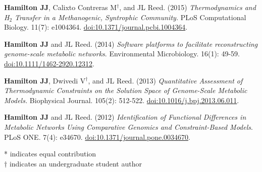 \documentclass[letterpaper,10pt]{article}
\begin{document}
\begin{etaremune}[itemsep=-2pt]
	\item \textbf{Hamilton JJ}, Calixto Contreras M$^\dagger$, and JL Reed. (2015) \emph{Thermodynamics and H$_2$ Transfer in a Methanogenic, Syntrophic Community.} PLoS Computational Biology. 11(7): e1004364. \href{http://journals.plos.org/ploscompbiol/article?id=10.1371/journal.pcbi.1004364}{doi:10.1371/journal.pcbi.1004364}.
	\item \textbf{Hamilton JJ} and JL Reed. (2014) \emph{Software platforms to facilitate reconstructing genome-scale metabolic networks}. Environmental Microbiology. 16(1): 49-59. \href{http://onlinelibrary.wiley.com/doi/10.1111/1462-2920.12312/abstract}{doi:10.1111/1462-2920.12312}.
	\item \textbf{Hamilton JJ}, Dwivedi V$^\dagger$, and JL Reed. (2013) \emph{Quantitative Assessment of Thermodynamic Constraints on the Solution Space of Genome-Scale Metabolic Models.} Biophysical Journal. 105(2): 512-522. \href{http://www.cell.com/biophysj/abstract/S0006-3495%2813%2900685-1}{doi:10.1016/j.bpj.2013.06.011}.
	\item \textbf{Hamilton JJ} and JL Reed. (2012) \emph{Identification of Functional Differences in Metabolic Networks Using Comparative Genomics and Constraint-Based Models}. PLoS ONE. 7(4): e34670. \href{http://journals.plos.org/plosone/article?id=10.1371/journal.pone.0034670}{doi:10.1371/journal.pone.0034670}.
\end{etaremune}
* indicates equal contribution \\
$\dagger$ indicates an undergraduate student author
\end{document}

